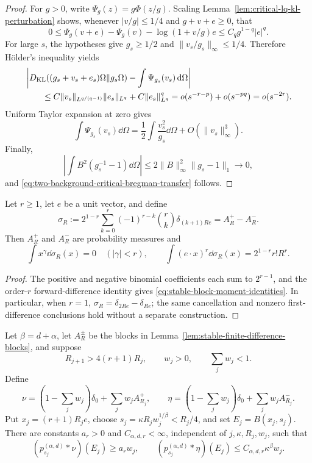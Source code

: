 \begin{proof}
For \(g>0\), write \(\Psi_g(z)=g\Phi(z/g)\).  Scaling
Lemma~\ref{lem:critical-lq-kl-perturbation} shows, whenever
\(|v/g|\le1/4\) and \(g+v+e\ge0\), that
\[
 0\le\Psi_g(v+e)-\Psi_g(v)
      -\log(1+v/g)e\le C_q g^{1-q}|e|^q.
\]
For large \(s\), the hypotheses give \(g_s\ge1/2\) and
\(\|v_s/g_s\|_\infty\le1/4\).  Therefore H\"older's inequality yields
\begin{align*}
 &\left|D_{\rm KL}((g_s+v_s+e_s)\Omega\|g_s\Omega)
       -\int\Psi_{g_s}(v_s)\,\mathrm{d}\Omega\right|\\
 &\qquad\le
 C\|v_s\|_{L^{q/(q-1)}}\|e_s\|_{L^q}
 +C\|e_s\|_{L^q}^q
 =o(s^{-r-p})+o(s^{-pq})=o(s^{-2r}).
\end{align*}
Uniform Taylor expansion at zero gives
\[
 \int\Psi_{g_s}(v_s)\dd\Omega
 =\frac12\int\frac{v_s^2}{g_s}\dd\Omega+O(\|v_s\|_\infty^3).
\]
Finally,
\[
 \left|\int B^2(g_s^{-1}-1)\dd\Omega\right|
 \le2\|B\|_\infty^2\|g_s-1\|_1\longrightarrow0,
\]
and \eqref{eq:two-background-critical-bregman-transfer} follows.
\end{proof}

\begin{lemma}
\label{lem:stable-finite-difference-blocks}
Let \(r\ge1\), let \(e\) be a unit vector, and define
\[
 \sigma_R:=2^{1-r}\sum_{k=0}^r(-1)^{r-k}\binom rk
                 \delta_{(k+1)Re}=A_R^+-A_R^-.
\]
Then \(A_R^+\) and \(A_R^-\) are probability measures and
\begin{equation}\label{eq:stable-block-moment-identities}
 \int x^\gamma\dd\sigma_R(x)=0\quad(|\gamma|<r),
 \qquad
 \int(e\cdot x)^r\dd\sigma_R(x)=2^{1-r}r!R^r.
\end{equation}
\end{lemma}

\begin{proof}
The positive and negative binomial coefficients each sum to \(2^{r-1}\),
and the order-\(r\) forward-difference identity gives
\eqref{eq:stable-block-moment-identities}.  In particular, when \(r=1\),
\(\sigma_R=\delta_{2Re}-\delta_{Re}\); the same cancellation and nonzero
first-difference conclusions hold without a separate construction.
\end{proof}

\begin{lemma}
\label{lem:stable-moving-ball-probability-separation}
Let \(\beta=d+\alpha\), let \(A_R^\pm\) be the blocks in
Lemma~\ref{lem:stable-finite-difference-blocks}, and suppose
\[
 R_{j+1}>4(r+1)R_j,
 \qquad w_j>0,
 \qquad \sum_jw_j<1.
\]
Define
\[
 \nu=\left(1-\sum_jw_j\right)\delta_0+\sum_jw_jA_{R_j}^+,
 \qquad
 \eta=\left(1-\sum_jw_j\right)\delta_0+\sum_jw_jA_{R_j}^-.
\]
Put \(x_j=(r+1)R_je\), choose
\(s_j=\kappa R_jw_j^{1/\beta}<R_j/4\), and set
\(E_j=B(x_j,s_j)\).  There are constants \(a_r>0\) and
\(C_{\alpha,d,r}<\infty\), independent of \(j,\kappa,R_j,w_j\), such that
\begin{equation}\label{eq:stable-moving-ball-probability-separation}
 (p_{s_j}^{(\alpha,d)}*\nu)(E_j)\ge a_rw_j,
 \qquad
 (p_{s_j}^{(\alpha,d)}*\eta)(E_j)
 \le C_{\alpha,d,r}\kappa^\beta w_j.
\end{equation}
\end{lemma}

